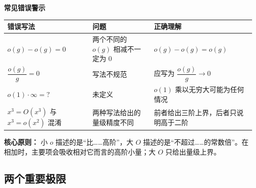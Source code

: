 \documentclass[fontset=fandol]{ctexart}
\newenvironment{custom}[1]{\par\noindent\textbf{#1}\quad}{\par\vspace{0.8em}}
\begin{document}
\begin{custom}{常见错误警示}



\begin{center}

\small

\begin{tabularx}{\textwidth}{|>{\raggedright\arraybackslash}X|>{\raggedright\arraybackslash}X|>{\raggedright\arraybackslash}X|}

\hline

\textbf{错误写法} & \textbf{问题} & \textbf{正确理解} \\

\hline

\(o(g) - o(g) = 0\) & 两个不同的 \(o(g)\) 相减不一定为 0 & \(o(g) - o(g) = o(g)\) \\

\hline

\(\dfrac{o(g)}{g} = 0\) & 写法不规范 & 应写为 \(\dfrac{o(g)}{g} \to 0\) \\

\hline

\(o(1) \cdot \infty = ?\) & 未定义 & \(o(1)\) 乘以无穷大可能为任何情况 \\

\hline

\(x^3=O(x^3)\) 与 \(x^3=o(x^2)\) 混淆 & 两种写法给出的量级精度不同 & 前者给出三阶上界，后者只说明高于二阶 \\

\hline

\end{tabularx}

\end{center}



\textbf{核心原则：} 小 \(o\) 描述的是“比……高阶”，大 \(O\) 描述的是“不超过……的常数倍”。在相加时，主要项会吸收相对它而言的高阶小量；大 \(O\) 只给出量级上界。

\end{custom}



\fi





\subsection{两个重要极限}
\end{document}
